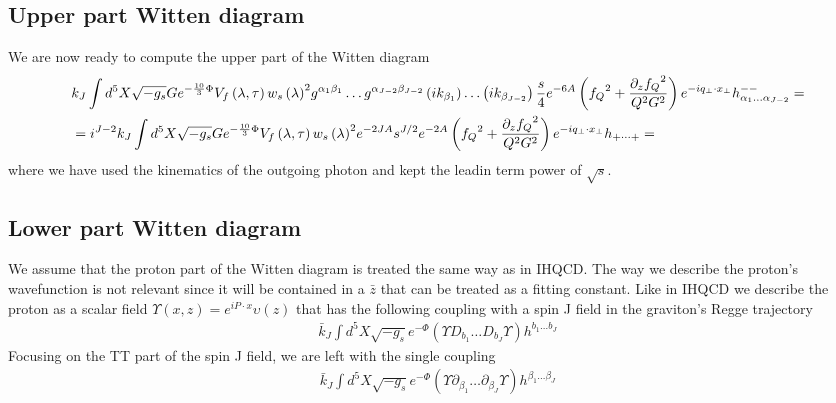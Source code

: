 \documentclass[10 pt]{article}
\begin{document}
\subsection{Upper part Witten diagram}
We are now ready to compute the upper part of the Witten diagram
\begin{align}
&k_J \int d^5X \sqrt{-g_s} G e^{-\frac{10}{3}\Phi} V_f \left( \lambda, \tau \right) {w_s\left(\lambda \right)}^2 g^{\alpha_1 \beta_1} \dots g^{\alpha_{J-2} \beta_{J-2}} \left( i k_{\beta_1}\right) \dots  \left( i k_{\beta_{J-2}}\right)  \frac{s}{4} e^{-6A} \left(  {f_Q}^2 + \frac{{\partial_z f_Q}^2}{Q^2 G^2}  \right) e^{-i q_\perp \cdot x_\perp} h^{--}_{\alpha_1 \dots \alpha_{J-2}} = \notag \\
& = i^{J-2} k_J \int d^5X \sqrt{-g_s} G e^{-\frac{10}{3}\Phi} V_f \left( \lambda, \tau \right) {w_s\left(\lambda \right)}^2 e^{-2 J A}  s^{J/2} e^{-2A} \left(  {f_Q}^2 + \frac{{\partial_z f_Q}^2}{Q^2 G^2}  \right) e^{-i q_\perp \cdot x_\perp} h_{+ \dots +} =
\end{align}
where we have used the kinematics of the outgoing photon and kept the leadin term power of $\sqrt{s}$.
\subsection{Lower part Witten diagram}
We assume that the proton part of the Witten diagram is treated the same way as in IHQCD. The way we describe the proton's wavefunction is not relevant since it will be contained in a $\bar{z}$ that can be treated as a fitting constant. Like in IHQCD we describe the proton as a scalar field $\Upsilon\left(x, z\right) = e^{i P \cdot x} \upsilon\left(z\right)$ that has the following coupling with a spin J field in the graviton's Regge trajectory
\begin{align}
\bar{k}_J \int d^5 X \sqrt{-g_s} e^{-\Phi} \left( \Upsilon D_{b_1} \dots D_{b_J} \Upsilon \right) h^{b_1 \dots b_J}
\end{align}
Focusing on the TT part of the spin J field, we are left with the single coupling
\begin{align}
\bar{k}_J \int d^5 X \sqrt{-g_s} e^{-\Phi} \left( \Upsilon \partial_{\beta_1} \dots \partial_{\beta_J} \Upsilon \right) h^{\beta_1 \dots \beta_J}
\end{align}
\end{document}

